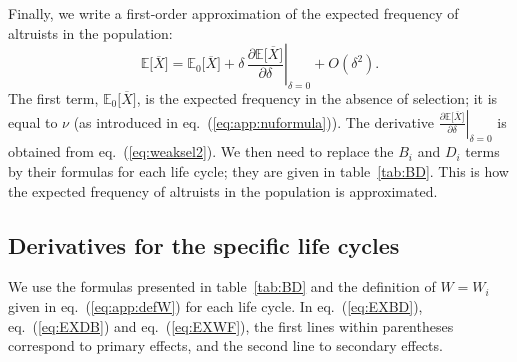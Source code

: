\documentclass[11pt, letterpaper]{article}
\renewcommand{\eqref}[1]{\textup{{\normalfont eq.~(\ref{#1}}\normalfont)}}
\newcommand{\deriv}[2]{\partial_{#2}\!{#1}\,}
\newcommand{\derivv}[3]{\left.\frac{\partial #1}{\partial #2}\right |_{#3=0}} %
\newcommand{\Esp}[1]{\mathbb{E}\big[ #1\big]}%
\newcommand{\Espzero}[1]{\mathbb{E}_0\big[ #1\big]}%
\newcommand{\bigO}[1]{O\left( #1 \right)}
\newcommand{\mutbias}{\nu}
\newcommand{\selstr}{\delta}
\begin{document}
Finally, we write a first-order approximation of the expected frequency of altruists in the population: 
\begin{equation}\label{eq:app:EXgeneric}
\Esp{\overline{X}} = \Espzero{\overline{X}} + \selstr \,  \derivv{\Esp{\overline{X}}}{\selstr}{\selstr} + \bigO{\selstr^2}.
\end{equation}
The first term, $\Espzero{\overline{X}}$, is the expected frequency in the absence of selection; it is equal to $\mutbias$ (as introduced in \eqref{eq:app:nuformula}). The derivative $\derivv{\Esp{\overline{X}}}{\selstr}{\selstr}$ is obtained from \eqref{eq:weaksel2}. We then need to replace the $B_{i}$ and $D_{i}$ terms by their formulas for each life cycle; they are given in table~\ref{tab:BD}. This is how the expected frequency of altruists in the population is approximated. 

\subsection{Derivatives for the specific life cycles\label{sec:app:dW}}

We use the formulas presented in table~\ref{tab:BD} and the definition of $W=W_i$ given in \eqref{eq:app:defW} for each life cycle. In \eqref{eq:EXBD}, \eqref{eq:EXDB} and \eqref{eq:EXWF}, the first lines within parentheses correspond to primary effects, and the second line to secondary effects. 
\end{document}
